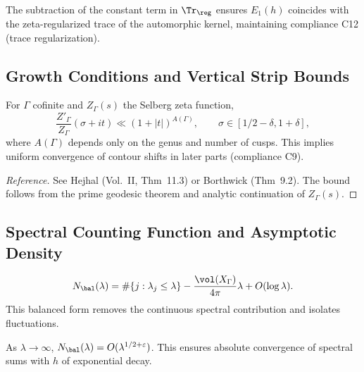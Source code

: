\begin{remark}\label{rem:balance}\relax
The subtraction of the constant term in $\Tr_\reg$ ensures $E_1(h)$ coincides with the zeta-regularized trace of the automorphic kernel, maintaining compliance C12 (trace regularization). %
\end{remark}

\subsection{Growth Conditions and Vertical Strip Bounds}\relax\hspace{0pt}
\label{subsec:vertical-bounds}\relax\hspace{0pt}

\begin{lemma}\label{lem:vertical-strip}\relax
For $\Gamma$ cofinite and $Z_\Gamma(s)$ the Selberg zeta function,
\[
\frac{Z'_\Gamma}{Z_\Gamma}(\sigma+it)\ll (1+|t|)^{A(\Gamma)},
\qquad \sigma\in[1/2-\delta,1+\delta],
\]
where $A(\Gamma)$ depends only on the genus and number of cusps.  
This implies uniform convergence of contour shifts in later parts (compliance C9). %
\end{lemma}

\begin{proof}[Reference]\relax
See Hejhal (Vol.~II, Thm~11.3) or Borthwick (Thm~9.2).  
The bound follows from the prime geodesic theorem and analytic continuation of $Z_\Gamma(s)$. %
\end{proof}

\subsection{Spectral Counting Function and Asymptotic Density}\relax\hspace{0pt}
\label{subsec:counting}\relax\hspace{0pt}

\begin{definition}\label{def:spectral-count}\relax
\[
N_\bal(\lambda)=\#\{j:\lambda_j\le\lambda\} - \frac{\vol(X_\Gamma)}{4\pi}\lambda + O(\log\lambda).
\]
This balanced form removes the continuous spectral contribution and isolates fluctuations. %
\end{definition}

\begin{proposition}\label{prop:weyl}\relax
As $\lambda\to\infty$, $N_\bal(\lambda)=O(\lambda^{1/2+\varepsilon})$.  
This ensures absolute convergence of spectral sums with $h$ of exponential decay. %
\end{proposition}


